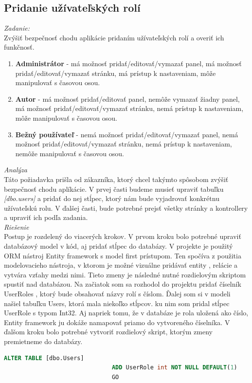 \documentclass[11pt, oneside]{report}
\begin{document}
\subsection{Pridanie užívateľských rolí}
\textit{Zadanie:}\\
Zvýšiť bezpečnosť chodu aplikácie pridaním užívateľských rolí a overiť ich funkčnosť.
\begin{enumerate}
\item \textbf{Administrátor} - má možnosť pridať/editovať/vymazať panel, má možnosť pridať/editovať/vymazať stránku, má prístup k nastaveniam, môže manipulovať s časovou osou.
\item \textbf{Autor} - má možnosť pridať/editovať panel, nemôže vymazať žiadny panel, má možnosť pridať/editovať/vymazať stránku, nemá prístup k nastaveniam, môže manipulovať s časovou osou.
\item \textbf{Bežný používateľ} - nemá možnosť pridať/editovať/vymazať panel, nemá možnosť pridať/editovať/vymazať stránku, nemá prístup k nastaveniam, nemôže manipulovať s časovou osou.
\end{enumerate}
\textit{Analýza}\\
Táto požiadavka prišla od zákazníka, ktorý chcel takýmto spôsobom zvýšiť bezpečnosť chodu aplíkácie.
V prvej časti budeme musieť upraviť tabuľku \textit{[dbo.users]} a pridať do nej stĺpec, ktorý nám bude vyjadrovať konkrétnu užívateľskú rolu. V ďalšej časti, bude potrebné prejsť všetky stránky a kontrollery a upraviť ich podľa zadania. 
\\\textit{Riešenie}\\
Postup je rozdelený do viacerých krokov. V prvom kroku bolo potrebné upraviť databázový model v kód, aj  pridať stĺpec do databázy. V projekte je použitý ORM nástroj Entity framework s model first prístupom. Ten spočíva z použitia  modelovacieho nástroja, v ktorom je možné vizuálne pridávať entity , relácie a vytvára vzťahy medzi nimi. Tieto zmeny je následné nutné rozdielovým skriptom spustiť nad databázou. Na začiatok som sa rozhodol do projektu pridať číselník \textsf{UserRoles} , ktorý bude obsahovať  názvy rolí s číslom. Ďalej som si v modeli našiel tabuľku Users, ktorá mala niekoľko stĺpcov.  ku nim som pridal stĺpec \textsf{UserRole} s typom \textsf{Int32}. Aj napriek tomu, že v databáze je rola uložená ako číslo, Entity framework ju dokáže namapovať priamo do vytvoreného číselníka. V ďalšom kroku bolo potrebné vytvoriť rozdielový skript, ktorým zmeny premietneme do databázy.
\begin{lstlisting}[language=SQL,caption=SQL skript pre pridanie užívateľelskej role,captionpos=b]
						       ALTER TABLE [dbo.Users]
						       ADD UserRole int NOT NULL DEFAULT(1)
						       GO
\end{lstlisting}
\end{document}

